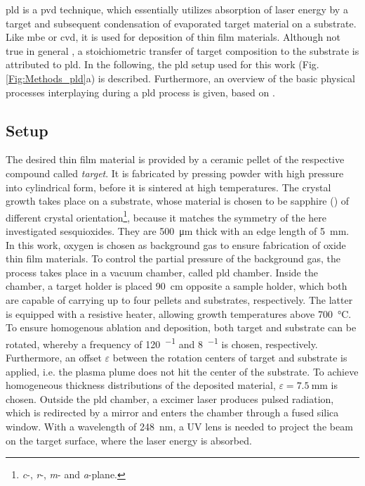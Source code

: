 \gls{pld} is a \gls{pvd} technique, which essentially utilizes absorption of laser energy by a target and subsequent condensation of evaporated target material on a substrate.
Like \gls{mbe} or \gls{cvd}, it is used for deposition of thin film materials.
Although not true in general \cite{lorenz2019}, a stoichiometric transfer of target composition to the substrate is attributed to \gls{pld}.
In the following, the \gls{pld} setup used for this work (Fig.\,\ref{Fig:Methods_pld}a) is described.
Furthermore, an overview of the basic physical processes interplaying during a \gls{pld} process is given, based on \textcite{lorenz2019}.

\subsection{Setup}\label{Sec:Methods_pld}
The desired thin film material is provided by a ceramic pellet of the respective compound called \emph{target}.
It is fabricated by pressing powder with high pressure into cylindrical form, before it is sintered at high temperatures.
The crystal growth takes place on a substrate, whose material is chosen to be sapphire () of different crystal orientation\footnote{
    \textit{c}-, \textit{r}-, \textit{m}- and \textit{a}-plane.
}, because it matches the symmetry of the here investigated sesquioxides.
They are \qty{500}{\um} thick with an edge length of \qty{5}{\mm}.
%
In this work, oxygen is chosen as background gas to ensure fabrication of oxide thin film materials.
To control the partial pressure of the background gas, the process takes place in a vacuum chamber, called \gls{pld} chamber.
Inside the chamber, a target holder is placed \qty{90}{\cm} opposite a sample holder, which both are capable of carrying up to four pellets and substrates, respectively.
The latter is equipped with a resistive heater, allowing growth temperatures above \qty{700}{\celsius}.
To ensure homogenous ablation and deposition, both target and substrate can be rotated, whereby a frequency of \qty{120}{\min^{-1}} and \qty{8}{\min^{-1}} is chosen, respectively.
Furthermore, an offset $\varepsilon$ between the rotation centers of target and substrate is applied, i.e. the plasma plume does not hit the center of the substrate.
To achieve homogeneous thickness distributions of the deposited material, $\varepsilon=\qty{7.5}{\mm}$ is chosen.
Outside the \gls{pld} chamber, a  excimer laser produces pulsed radiation, which is redirected by a mirror and enters the chamber through a fused silica window.
With a wavelength of \qty{248}{\nm}, a UV lens is needed to project the beam on the target surface, where the laser energy is absorbed.
